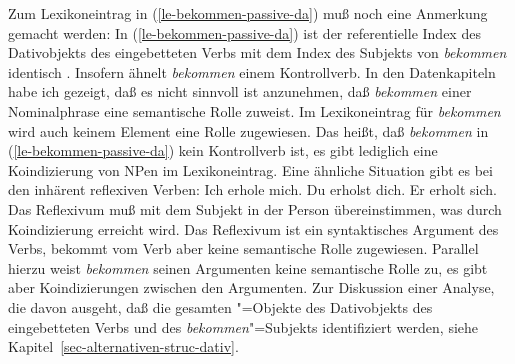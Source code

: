 \noindent
Zum Lexikoneintrag in (\ref{le-bekommen-passive-da}) muß noch eine Anmerkung gemacht werden:
In (\ref{le-bekommen-passive-da}) ist der referentielle Index des Dativobjekts des eingebetteten
Verbs mit dem Index des Subjekts von \emph{bekommen} identisch . Insofern
ähnelt \emph{bekommen} einem Kontrollverb. In den Datenkapiteln habe ich gezeigt,
daß es nicht sinnvoll ist anzunehmen, daß \emph{bekommen} einer Nominalphrase eine
semantische Rolle zuweist. Im Lexikoneintrag für \emph{bekommen} wird auch keinem Element eine
Rolle zugewiesen. Das heißt, daß \emph{bekommen} in (\ref{le-bekommen-passive-da}) kein Kontrollverb ist,
es gibt lediglich eine Koindizierung von NPen im Lexikoneintrag. Eine ähnliche Situation gibt
es bei den inhärent reflexiven Verben:
\eal
\ex Ich erhole mich.
\ex Du erholst dich.
\ex Er erholt sich.
\zl
Das Reflexivum muß mit dem Subjekt in der Person übereinstimmen, was durch Koindizierung erreicht wird.
Das Reflexivum ist ein syntaktisches Argument des Verbs, bekommt vom Verb aber keine semantische Rolle zugewiesen.
Parallel hierzu weist \emph{bekommen} seinen Argumenten keine semantische
Rolle zu, es gibt aber Koindizierungen zwischen den Argumenten. Zur Diskussion einer Analyse,
die davon ausgeht, daß die gesamten "=Objekte des Dativobjekts des eingebetteten Verbs
und des \emph{bekommen}"=Subjekts identifiziert werden, siehe Kapitel~\ref{sec-alternativen-struc-dativ}.


\begin{comment}
The embedding of the dative passive under {\em sein}, which is marginally possible \citep[\page6]{Haider86},
can also be explained:
\eal
\label{ex-ist-zu-bekommen}
\ex[?]{
So   etwas     ist leicht geschenkt zu kriegen.
}
\ex[?]{
So ein Preis ist leicht zugesprochen zu kriegen.
}
\zl
Since the lexical entry of \emph{zu kriegen}, which is parallel to that of \emph{bekommen}
we saw in (\ref{le-bekommen}), is specified to raise the \textsc{acc} value of its verbal complement
\emph{geschenkt} in (\mex{0}a), the modal \sein can raise the object of \emph{geschenkt zu kriegen}
to the subject of the complete verbal complex.
Unfortunately this specification of \accf also allows sentences like (\mex{1}) which
I find unacceptable:
\ea[*]{
In diesem Saal sind viele Preise verliehen bekommen worden.\footnote{
        \citet{Kathol91a} marks this sentences with a question mark.
}
}
\z
(\mex{-1}) and (\mex{0}) can be ruled out by assuming that the dative passive auxiliary
is unakkusativisch as the other passive auxiliaries, \ie, that the \textsc{subj} value and the
\textsc{acc} value of \emph{bekommen} are identical.
\end{comment}




